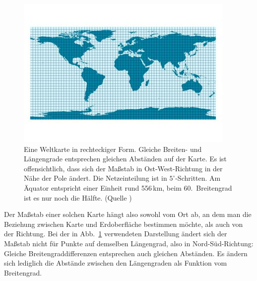\begin{figure}
\includegraphics[trim= 0cm 1.0cm 0.3cm 1.0cm,clip,scale=0.6]{./Bilder/Zylinderprojektion.jpg}
\caption{\label{fig_Zylinder}%
Eine Weltkarte in rechteckiger Form. Gleiche Breiten- und
L\"angengrade entsprechen gleichen Abst\"anden auf der Karte. Es ist offensichtlich, dass sich
der Ma\ss stab in Ost-West-Richtung in der N\"ahe der Pole \"andert. Die Netzeinteilung ist
in $5^\circ$-Schritten. Am \"Aquator entspricht einer Einheit rund 556\,km, beim $60$.\ Breitengrad
ist es nur noch die H\"alfte. (Quelle \cite{WikiNetz})}  
\end{figure}
 
Der Ma\ss stab einer solchen Karte h\"angt also sowohl vom Ort ab, an dem man 
die Beziehung zwischen Karte und Erdoberfl\"ache bestimmen m\"ochte, als auch von der
Richtung. Bei der in Abb.\ \ref{fig_Zylinder} verwendeten Darstellung \"andert sich der
Ma\ss stab nicht f\"ur Punkte auf demselben L\"angengrad, also in Nord-S\"ud-Richtung: 
Gleiche Breitengraddifferenzen entsprechen auch
gleichen Abst\"anden. Es \"andern sich lediglich die Abst\"ande zwischen den L\"angengraden 
als Funktion vom Breitengrad.  

